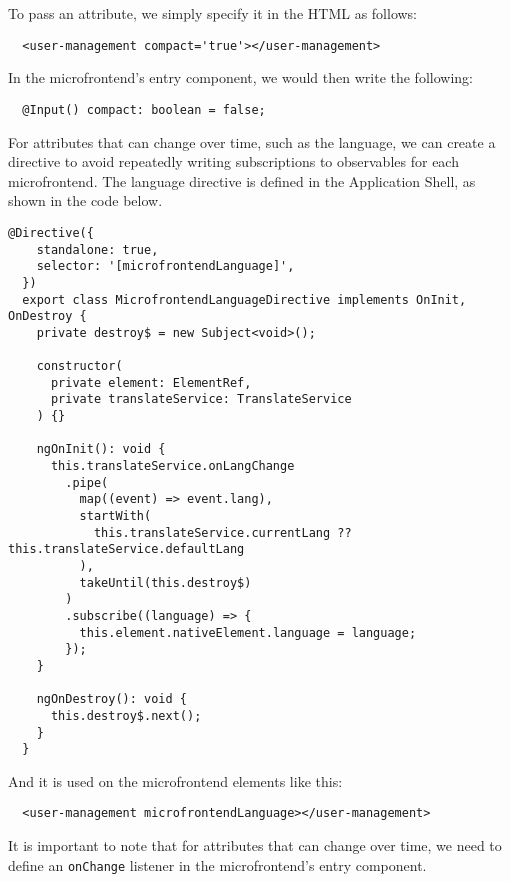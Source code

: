 To pass an attribute, we simply specify it in the HTML as follows:
\begin{lstlisting}
  <user-management compact='true'></user-management>
\end{lstlisting}
In the microfrontend's entry component, we would then write the following:
\begin{lstlisting}
  @Input() compact: boolean = false;
\end{lstlisting}
For attributes that can change over time, such as the language, we can create a directive to avoid repeatedly writing subscriptions to observables for each microfrontend. The language directive is defined in the Application Shell, as shown in the code below.
\begin{lstlisting}[caption={Angular directive for synchronizing language changes with microfrontends}]
  @Directive({
    standalone: true,
    selector: '[microfrontendLanguage]',
  })
  export class MicrofrontendLanguageDirective implements OnInit, OnDestroy {
    private destroy$ = new Subject<void>();
    
    constructor(
      private element: ElementRef,
      private translateService: TranslateService
    ) {}
    
    ngOnInit(): void {
      this.translateService.onLangChange
        .pipe(
          map((event) => event.lang),
          startWith(
            this.translateService.currentLang ?? this.translateService.defaultLang
          ),
          takeUntil(this.destroy$)
        )
        .subscribe((language) => {
          this.element.nativeElement.language = language;
        });
    }
    
    ngOnDestroy(): void {
      this.destroy$.next();
    }
  }
\end{lstlisting}
And it is used on the microfrontend elements like this:
\begin{lstlisting}
  <user-management microfrontendLanguage></user-management>
\end{lstlisting}
It is important to note that for attributes that can change over time, we need to define an \texttt{onChange} listener in the microfrontend's entry component.

